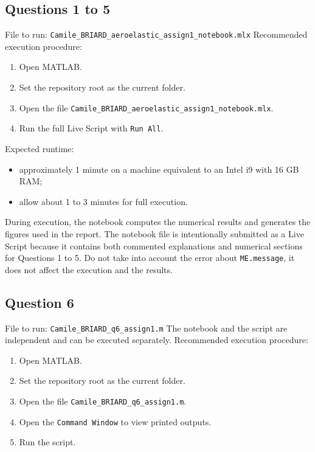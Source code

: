 \subsection*{Questions 1 to 5}
File to run: \texttt{Camile\_BRIARD\_aeroelastic\_assign1\_notebook.mlx} Recommended execution procedure:
\begin{enumerate}\itemsep=0pt\parsep=0pt
\item Open MATLAB.
\item Set the repository root as the current folder.
\item Open the file \texttt{Camile\_BRIARD\_aeroelastic\_assign1\_notebook.mlx}.
\item Run the full Live Script with \texttt{Run All}.
\end{enumerate}
Expected runtime:
\begin{itemize}\itemsep=0pt\parsep=0pt
\item approximately 1 minute on a machine equivalent to an Intel i9 with 16 GB RAM;
\item allow about 1 to 3 minutes for full execution.
\end{itemize}
During execution, the notebook computes the numerical results and generates the figures used in the report.
The notebook file is intentionally submitted as a Live Script because it contains both commented explanations and numerical sections for Questions 1 to 5.
Do not take into account the error about \texttt{ME.message}, it does not affect the execution and the results.
\subsection*{Question 6}
File to run: \texttt{Camile\_BRIARD\_q6\_assign1.m} The notebook and the script are independent and can be executed separately. Recommended execution procedure:
\begin{enumerate}\itemsep=0pt\parsep=0pt
\item Open MATLAB.
\item Set the repository root as the current folder.
\item Open the file \texttt{Camile\_BRIARD\_q6\_assign1.m}.
\item Open the \texttt{Command Window} to view printed outputs.
\item Run the script.
\end{enumerate}